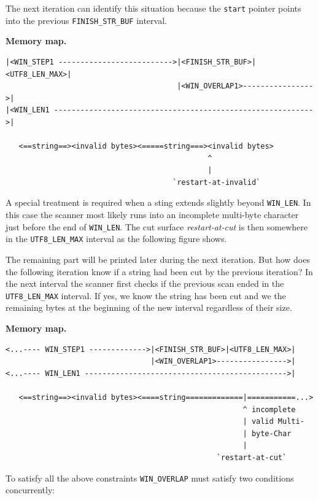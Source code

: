 The next iteration can identify this situation because the
\texttt{start} pointer points into the previous
\texttt{FINISH\_STR\_BUF} interval.

\textbf{Memory map.}

\begin{verbatim}
|<WIN_STEP1 -------------------------->|<FINISH_STR_BUF>|<UTF8_LEN_MAX>|
                                       |<WIN_OVERLAP1>---------------->|
|<WIN_LEN1 ----------------------------------------------------------->|

   <==string==><invalid bytes><=====string===><invalid bytes>
                                              ^
                                              |
                                      `restart-at-invalid`
\end{verbatim}

A special treatment is required when a sting extends slightly beyond
\texttt{WIN\_LEN}. In this case the scanner most likely runs into an
incomplete multi-byte character just before the end of
\texttt{WIN\_LEN}. The cut surface \emph{restart-at-cut} is then
somewhere in the \texttt{UTF8\_LEN\_MAX} interval as the following
figure shows.

The remaining part will be printed later during the next iteration. But
how does the following iteration know if a string had been cut by the
previous iteration? In the next interval the scanner first checks if the
previous scan ended in the \texttt{UTF8\_LEN\_MAX} interval. If yes, we
know the string has been cut and we the remaining bytes at the beginning
of the new interval regardless of their size.

\textbf{Memory map.}

\begin{verbatim}
<...---- WIN_STEP1 ------------->|<FINISH_STR_BUF>|<UTF8_LEN_MAX>|
                                 |<WIN_OVERLAP1>---------------->|
<...---- WIN_LEN1 ---------------------------------------------->|

   <==string==><invalid bytes><====string=============|===========...>
                                                      ^ incomplete
                                                      | valid Multi-
                                                      | byte-Char
                                                      |
                                                `restart-at-cut`
\end{verbatim}

To satisfy all the above constraints \texttt{WIN\_OVERLAP} must satisfy
two conditions concurrently:

